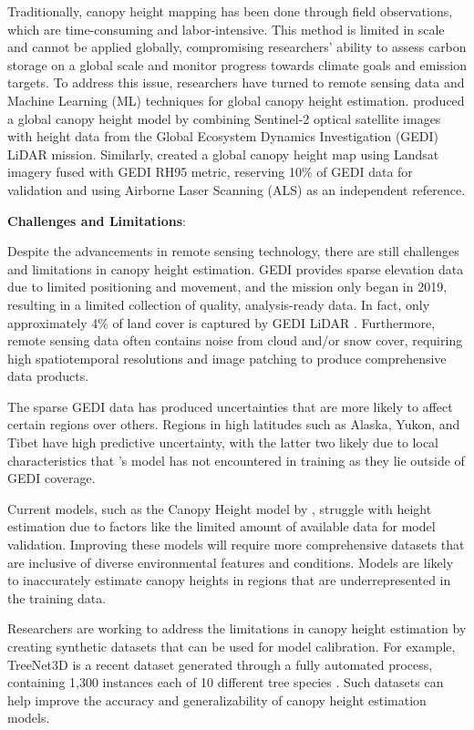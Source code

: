 \documentclass[12pt, man, dvipsnames, floatsintext]{apa7}
\begin{document}
Traditionally, canopy height mapping has been done through field
observations, which are time-consuming and labor-intensive. This method
is limited in scale and cannot be applied globally, compromising
researchers' ability to assess carbon storage on a global scale and
monitor progress towards climate goals and emission targets. To address
this issue, researchers have turned to remote sensing data and Machine
Learning (ML) techniques for global canopy height estimation.
\textcite{Lang2023} produced a global canopy height model by combining
Sentinel-2 optical satellite images with height data from the Global
Ecosystem Dynamics Investigation (GEDI) LiDAR mission. Similarly,
\textcite{Potapov2021} created a global canopy height map using Landsat
imagery fused with GEDI RH95 metric, reserving 10\% of GEDI data for
validation and using Airborne Laser Scanning (ALS) as an independent
reference.

\textbf{Challenges and Limitations}:

Despite the advancements in remote sensing technology, there are still
challenges and limitations in canopy height estimation. GEDI provides
sparse elevation data due to limited positioning and movement, and the
mission only began in 2019, resulting in a limited collection of
quality, analysis-ready data. In fact, only approximately 4\% of land
cover is captured by GEDI LiDAR \parencite{Lang2023}. Furthermore,
remote sensing data often contains noise from cloud and/or snow cover,
requiring high spatiotemporal resolutions and image patching to produce
comprehensive data products.

The sparse GEDI data has produced uncertainties that are more likely to
affect certain regions over others. Regions in high latitudes such as
Alaska, Yukon, and Tibet have high predictive uncertainty, with the
latter two likely due to local characteristics that
\citeauthor{Lang2023}'s \citeyear{Lang2023} model has not encountered in
training as they lie outside of GEDI coverage.

Current models, such as the Canopy Height model by \textcite{Lang2023},
struggle with height estimation due to factors like the limited amount
of available data for model validation. Improving these models will
require more comprehensive datasets that are inclusive of diverse
environmental features and conditions. Models are likely to inaccurately
estimate canopy heights in regions that are underrepresented in the
training data.

Researchers are working to address the limitations in canopy height
estimation by creating synthetic datasets that can be used for model
calibration. For example, TreeNet3D is a recent dataset generated
through a fully automated process, containing 1,300 instances each of 10
different tree species \parencite{Tang2024}. Such datasets can help
improve the accuracy and generalizability of canopy height estimation
models.
\end{document}
